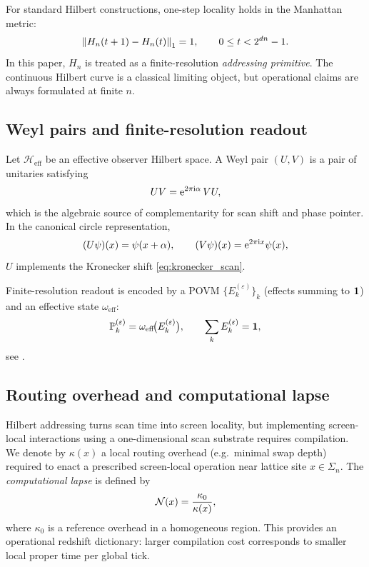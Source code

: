 For standard Hilbert constructions, one-step locality holds in the Manhattan metric:
\begin{equation}
\label{eq:hilbert_locality}
\left\lVert H_n(t+1)-H_n(t)\right\rVert_1=1,
\qquad 0\le t<2^{dn}-1.
\end{equation}
In this paper, $H_n$ is treated as a finite-resolution \emph{addressing primitive}.
The continuous Hilbert curve is a classical limiting object, but operational claims are always formulated at finite $n$.

\subsection{Weyl pairs and finite-resolution readout}
\label{sec:weyl_readout_prelim}

Let $\mathcal{H}_{\mathrm{eff}}$ be an effective observer Hilbert space.
A Weyl pair $(U,V)$ is a pair of unitaries satisfying
\begin{equation}
\label{eq:weyl_relation}
UV=\mathrm{e}^{2\pi \mathrm{i}\alpha}\,VU,
\end{equation}
which is the algebraic source of complementarity for scan shift and phase pointer.
In the canonical circle representation,
\[
(U\psi)(x)=\psi(x+\alpha),\qquad (V\psi)(x)=\mathrm{e}^{2\pi \mathrm{i} x}\psi(x),
\]
$U$ implements the Kronecker shift \eqref{eq:kronecker_scan}.

Finite-resolution readout is encoded by a POVM $\{E_k^{(\varepsilon)}\}_k$ (effects summing to $\mathbf{1}$) and an effective state $\omega_{\mathrm{eff}}$:
\begin{equation}
\label{eq:povm_probability}
\mathbb{P}_k^{(\varepsilon)}=\omega_{\mathrm{eff}}\!\bigl(E_k^{(\varepsilon)}\bigr),
\qquad \sum_k E_k^{(\varepsilon)}=\mathbf{1},
\end{equation}
see \cite{Kraus1983,NielsenChuang2000,Busch2003}.

\subsection{Routing overhead and computational lapse}
\label{sec:routing_overhead_prelim}

Hilbert addressing turns scan time into screen locality, but implementing screen-local interactions using a one-dimensional scan substrate requires compilation.
We denote by $\kappa(x)$ a local routing overhead (e.g.\ minimal swap depth) required to enact a prescribed screen-local operation near lattice site $x\in\Sigma_n$.
The \emph{computational lapse} is defined by
\begin{equation}
\label{eq:lapse_def}
\mathcal{N}(x)=\frac{\kappa_0}{\kappa(x)},
\end{equation}
where $\kappa_0$ is a reference overhead in a homogeneous region.
This provides an operational redshift dictionary: larger compilation cost corresponds to smaller local proper time per global tick.

